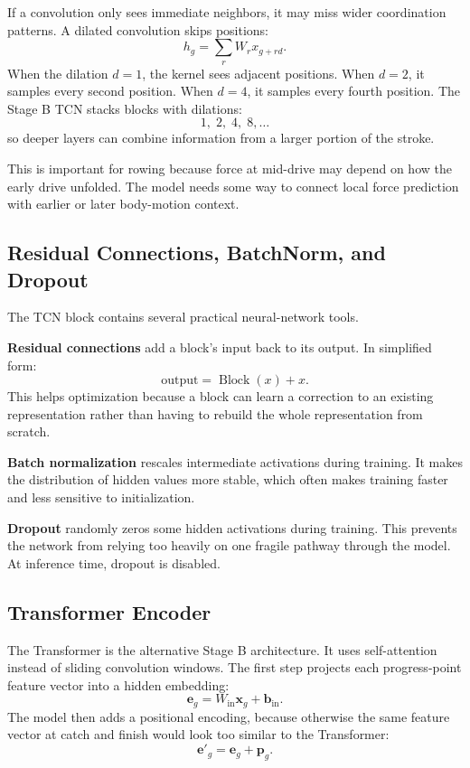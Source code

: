 \documentclass[11pt]{article}
\newcommand{\vect}[1]{\boldsymbol{#1}}
\begin{document}
If a convolution only sees immediate neighbors, it may miss wider coordination
patterns. A dilated convolution skips positions:
\[
  h_g
  =
  \sum_r W_r x_{g+rd}.
\]
When the dilation \(d=1\), the kernel sees adjacent positions. When \(d=2\), it
samples every second position. When \(d=4\), it samples every fourth position.
The Stage B TCN stacks blocks with dilations:
\[
  1,\;2,\;4,\;8,\ldots
\]
so deeper layers can combine information from a larger portion of the stroke.

This is important for rowing because force at mid-drive may depend on how the
early drive unfolded. The model needs some way to connect local force
prediction with earlier or later body-motion context.

\subsection{Residual Connections, BatchNorm, and Dropout}

The TCN block contains several practical neural-network tools.

\textbf{Residual connections} add a block's input back to its output. In
simplified form:
\[
  \text{output} = \operatorname{Block}(x) + x.
\]
This helps optimization because a block can learn a correction to an existing
representation rather than having to rebuild the whole representation from
scratch.

\textbf{Batch normalization} rescales intermediate activations during training.
It makes the distribution of hidden values more stable, which often makes
training faster and less sensitive to initialization.

\textbf{Dropout} randomly zeros some hidden activations during training. This
prevents the network from relying too heavily on one fragile pathway through
the model. At inference time, dropout is disabled.

\subsection{Transformer Encoder}

The Transformer is the alternative Stage B architecture. It uses self-attention
instead of sliding convolution windows. The first step projects each
progress-point feature vector into a hidden embedding:
\[
  \vect{e}_g = W_{\text{in}}\vect{x}_g+\vect{b}_{\text{in}}.
\]
The model then adds a positional encoding, because otherwise the same feature
vector at catch and finish would look too similar to the Transformer:
\[
  \vect{e}'_g = \vect{e}_g + \vect{p}_g.
\]
\end{document}
